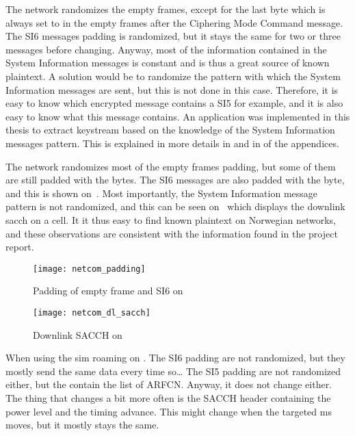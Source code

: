       The  network randomizes the empty frames, except for
      the last byte which is always set to  in the empty
      frames after the Ciphering Mode Command message. The SI6 messages
      padding is randomized, but it stays the same for two or three
      messages before changing. Anyway, most of the information
      contained in the System Information messages is constant and is
      thus a great source of known plaintext. A solution would be to
      randomize the pattern with which the System Information messages
      are sent, but this is not done in this case. Therefore, it is easy
      to know which encrypted message contains a SI5 for example, and it
      is also easy to know what this message contains. An application
      was implemented in this thesis to extract keystream based on the
      knowledge of the System Information messages pattern. This is
      explained in more details in  and
      in  of the appendices. 
      
      The  network randomizes most of the empty frames
      padding, but some of them are still padded with the 
      bytes. The SI6 messages are also padded with the  byte,
      and this is shown on~. Most importantly,
      the System Information message pattern is not randomized, and this
      can be seen on~ which displays the
      downlink \gls{sacch} on a  cell. It it thus easy to
      find known plaintext on Norwegian networks, and these observations
      are consistent with the information found in the 
      project report.

      \begin{figure}
        \centering
        \texttt{[image: netcom\_padding]}
        \caption{Padding of empty frame and SI6 on }
        \label{fig:netcom_padding}
      \end{figure}

      \begin{figure}
        \centering
        \texttt{[image: netcom\_dl\_sacch]}
        \caption{Downlink SACCH on }
        \label{fig:netcom_dl_sacch}
      \end{figure}

      \iffalse
      When using
      the  \gls{sim} roaming on . The SI6
      padding are not randomized, but they mostly send the same data
      every time so… The SI5 padding are not randomized either, but the
      contain the list of ARFCN. Anyway, it does not change either. The
      thing that changes a bit more often is the SACCH header containing
      the power level and the timing advance. This might change when the
      targeted \gls{ms} moves, but it mostly stays the same.

